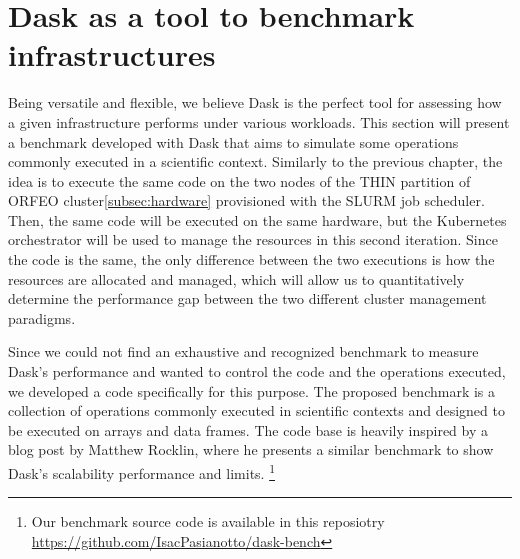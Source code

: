 \section{Dask as a tool to benchmark infrastructures}\label{sec:daskbenchmark}

Being versatile and flexible, we believe Dask is the perfect tool for assessing
how a given infrastructure performs under various workloads. This section will
present a benchmark developed with Dask that aims to simulate some operations
commonly executed in a scientific context. Similarly to the previous chapter,
the idea is to execute the same code on the two nodes of the THIN partition of
ORFEO cluster\ref{subsec:hardware} provisioned with the SLURM job scheduler.
Then, the same code will be executed on the same hardware, but the Kubernetes
orchestrator will be used to manage the resources in this second iteration.
Since the code is the same, the only difference between the two executions is
how the resources are allocated and managed, which will allow us to
quantitatively determine the performance gap between the two different cluster
management paradigms.


Since we could not find an exhaustive and recognized benchmark to measure Dask's
performance and wanted to control the code and the operations executed, we
developed a code specifically for this purpose.  The proposed benchmark is a
collection of operations commonly executed in scientific contexts and designed
to be executed on arrays and data frames. The code base is heavily inspired by a
blog post by Matthew Rocklin, where he presents a similar benchmark to show
Dask's scalability performance and limits\cite{Rocklinblog}. \footnote{ Our
benchmark source code is available in this
reposiotry \url{https://github.com/IsacPasianotto/dask-bench}} 


